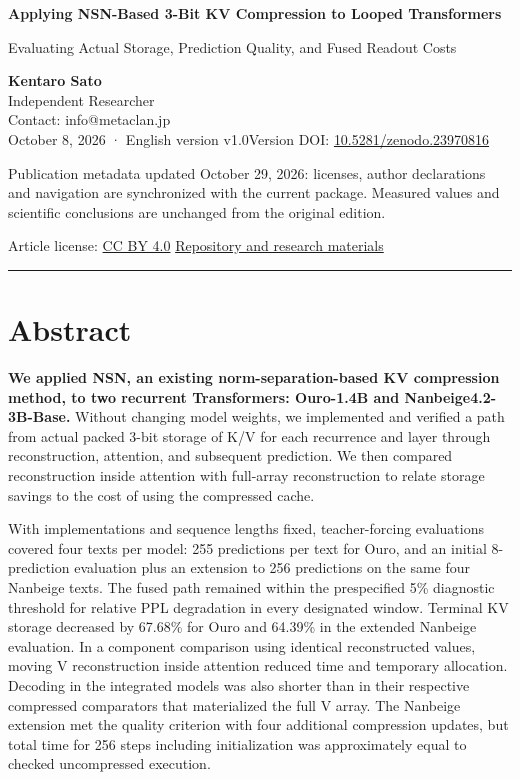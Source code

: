 \documentclass[10pt,a4paper]{article}
\begin{document}
\fontsize{10.7}{15.3}\selectfont\thispagestyle{first}
{\raggedright\sffamily\bfseries\color{ink}\fontsize{22}{27}\selectfont Applying NSN-Based 3-Bit KV Compression to Looped Transformers\par}

{\raggedright\sffamily\fontsize{13}{17}\selectfont\color{accent} Evaluating Actual Storage, Prediction Quality, and Fused Readout Costs\par}

{\small \textbf{Kentaro Sato}\\
Independent Researcher\\
Contact: info@metaclan.jp\\
October 8, 2026 · English version v1.0\quad\textbar\quad Version DOI: \href{https://doi.org/10.5281/zenodo.23970816}{10.5281/zenodo.23970816}

Publication metadata updated October 29, 2026: licenses, author declarations and navigation are synchronized with the current package. Measured values and scientific conclusions are unchanged from the original edition.\par}
{\small Article license: \href{https://creativecommons.org/licenses/by/4.0/}{CC BY 4.0} \quad\textbar\quad \href{https://github.com/metaSATOKEN/nsn/tree/c37d39ea0106274d9f661cfbb268b0ed05319846}{Repository and research materials}\par}\smallskip\hrule\medskip

\section{Abstract}\label{abstract}

\textbf{We applied NSN, an existing norm-separation-based KV compression method, to two recurrent Transformers: Ouro-1.4B and Nanbeige4.2-3B-Base.} Without changing model weights, we implemented and verified a path from actual packed 3-bit storage of K/V for each recurrence and layer through reconstruction, attention, and subsequent prediction. We then compared reconstruction inside attention with full-array reconstruction to relate storage savings to the cost of using the compressed cache.

With implementations and sequence lengths fixed, teacher-forcing evaluations covered four texts per model: 255 predictions per text for Ouro, and an initial 8-prediction evaluation plus an extension to 256 predictions on the same four Nanbeige texts. The fused path remained within the prespecified 5\% diagnostic threshold for relative PPL degradation in every designated window. Terminal KV storage decreased by 67.68\% for Ouro and 64.39\% in the extended Nanbeige evaluation. In a component comparison using identical reconstructed values, moving V reconstruction inside attention reduced time and temporary allocation. Decoding in the integrated models was also shorter than in their respective compressed comparators that materialized the full V array. The Nanbeige extension met the quality criterion with four additional compression updates, but total time for 256 steps including initialization was approximately equal to checked uncompressed execution.
\end{document}
